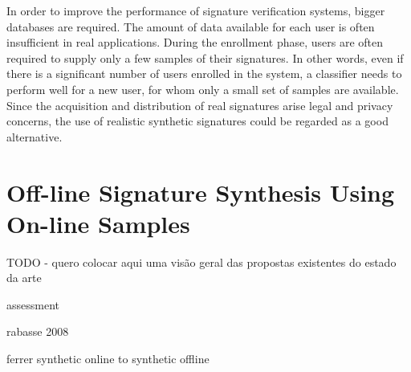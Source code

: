 In order to improve the performance of signature verification
systems, bigger databases are required. The amount of data available for each user is often
insufficient in real applications. During the enrollment phase,
users are often required to supply only a few samples of their
signatures. In other words, even if there is a significant number
of users enrolled in the system, a classifier needs to perform
well for a new user, for whom only a small set of samples are
available. Since the acquisition
and distribution of real signatures arise legal and privacy
concerns, the use of realistic synthetic signatures could be
regarded as a good alternative. 

\section{Off-line Signature Synthesis Using On-line Samples}
TODO - quero colocar aqui uma visão geral das propostas existentes do estado da arte

assessment \cite{guest2013assessment}

rabasse 2008 \cite{rabasse2008new}

ferrer synthetic online to synthetic offline \cite{ferrer2013realistic}

\cite{diaz2014generation}

\cite{diaz2014cognitive}

